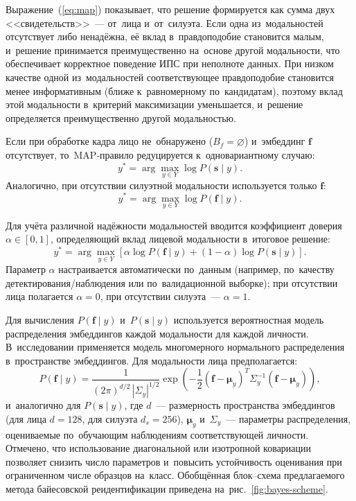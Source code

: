Выражение~(\ref{eq:map}) показывает, что решение формируется как сумма двух
<<свидетельств>>~--- от~лица и~от~силуэта. Если одна из~модальностей отсутствует
либо ненадёжна, её вклад в~правдоподобие становится малым, и~решение
принимается преимущественно на~основе другой модальности, что обеспечивает
корректное поведение ИПС при неполноте данных. При низком качестве одной
из~модальностей соответствующее правдоподобие становится менее информативным
(ближе к~равномерному по~кандидатам), поэтому вклад этой модальности
в~критерий максимизации уменьшается, и~решение определяется преимущественно
другой модальностью.

Если при обработке кадра лицо не~обнаружено ($B_f=\varnothing$) и~эмбеддинг
$\mathbf{f}$ отсутствует, то~MAP‑правило редуцируется к~одновариантному случаю:
\begin{equation}
    y^*=\arg\max\limits_{y\in Y}\log P(\mathbf{s}\mid y).
    \label{eq:map-only-s}
\end{equation}
Аналогично, при отсутствии силуэтной модальности используется только
$\mathbf{f}$:
\begin{equation}
    y^*=\arg\max\limits_{y\in Y}\log P(\mathbf{f}\mid y).
    \label{eq:map-only-f}
\end{equation}

Для учёта различной надёжности модальностей вводится коэффициент доверия
$\alpha\in[0,1]$, определяющий вклад лицевой модальности в~итоговое решение:
\begin{equation}
    y^*=\arg\max\limits_{y\in Y}
    \left[\alpha\log P(\mathbf{f}\mid y)+(1-\alpha)\log P(\mathbf{s}\mid y)\right].
    \label{eq:map-weighted}
\end{equation}
Параметр $\alpha$ настраивается автоматически по~данным (например, по~качеству
детектирования/наблюдения или по~валидационной выборке); при отсутствии лица
полагается $\alpha=0$, при отсутствии силуэта~--- $\alpha=1$.

Для вычисления $P(\mathbf{f}\mid y)$ и~$P(\mathbf{s}\mid y)$ используется
вероятностная модель распределения эмбеддингов каждой модальности для каждой
личности. В~исследовании применяется модель многомерного нормального
распределения в~пространстве эмбеддингов. Для модальности лица
предполагается:
\begin{equation}
    P(\mathbf{f}\mid y)=
    \frac{1}{(2\pi)^{d/2}\,|\Sigma_y|^{1/2}}
    \exp\!\left(-\frac{1}{2}(\mathbf{f}-\boldsymbol{\mu}_y)^T
    \Sigma_y^{-1}(\mathbf{f}-\boldsymbol{\mu}_y)\right),
    \label{eq:gauss}
\end{equation}
и~аналогично для $P(\mathbf{s}\mid y)$, где $d$~--- размерность пространства
эмбеддингов (для лица $d=128$, для силуэта $d_s=256$),
$\boldsymbol{\mu}_y$ и~$\Sigma_y$~--- параметры распределения, оцениваемые
по~обучающим наблюдениям соответствующей личности. Отмечено, что использование
диагональной или изотропной ковариации позволяет снизить число параметров
и~повысить устойчивость оценивания при ограниченном числе образцов на~класс.
Обобщённая блок--схема предлагаемого метода байесовской реидентификации
приведена на~рис.~\ref{fig:bayes-scheme}.

